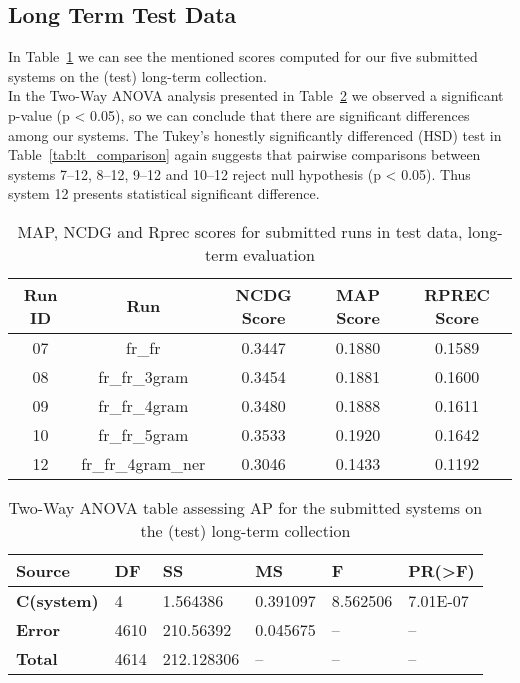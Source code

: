 \subsection{Long Term Test Data}\label{subsec:long_term}

In Table~\ref{tab:lt_scores} we can see the mentioned scores computed for our five submitted systems on the (test)
long-term collection.\\

In the Two-Way ANOVA analysis presented in Table~\ref{tab:lt_anova} we observed a significant p-value (p < 0.05), so we
can conclude that there are significant differences among our systems.
The Tukey's honestly significantly differenced (HSD) test in Table~\ref{tab:lt_comparison} again suggests that pairwise
comparisons between systems 7--12, 8--12, 9--12 and 10--12 reject null hypothesis (p < 0.05).
Thus system 12 presents statistical significant difference.

\begin{table}[h!]
    \begin{center}
        \caption{MAP, NCDG and Rprec scores for submitted runs in test data, long-term evaluation}
        \label{tab:lt_scores}
        \begin{tabular}{|c|c||c|c|c|}
            \hline
            \textbf{Run ID} & \textbf{Run} & \textbf{NCDG Score} & \textbf{MAP Score} & \textbf{RPREC Score}\\
            \hline\hline
            07 & fr\_fr & 0.3447 & 0.1880 & 0.1589 \\
            \hline
            08 & fr\_fr\_3gram & 0.3454 & 0.1881 & 0.1600 \\
            \hline
            09 & fr\_fr\_4gram & 0.3480 & 0.1888 & 0.1611 \\
            \hline
            10 & fr\_fr\_5gram & 0.3533 & 0.1920 & 0.1642 \\
            \hline
            12 & fr\_fr\_4gram\_ner & 0.3046 & 0.1433 & 0.1192\\
            \hline
        \end{tabular}
    \end{center}
\end{table}

\begin{table}[!ht]
    \centering
    \caption{Two-Way ANOVA table assessing AP for the submitted systems on the (test) long-term collection}
    \label{tab:lt_anova}
    \begin{tabular}{|l|l|l|l|l|l|}
    \hline
        \textbf{Source} & \textbf{DF} & \textbf{SS} & \textbf{MS} & \textbf{F} & \textbf{PR(>F)} \\ \hline\hline
        \textbf{C(system)} & 4 & 1.564386 & 0.391097 & 8.562506 & 7.01E-07 \\ \hline
        \textbf{Error} & 4610 & 210.56392 & 0.045675 & -- & -- \\ \hline
        \textbf{Total} & 4614 & 212.128306 & -- & -- & -- \\ \hline
    \end{tabular}
\end{table}

